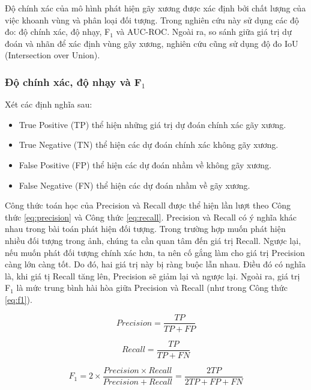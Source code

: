 \documentclass[../the.tex]{subfiles}
\begin{document}
{\fontsize{13}{12} \selectfont
Độ chính xác của mô hình phát hiện gãy xương được xác định bởi chất lượng của việc khoanh vùng và phân loại đối tượng. Trong nghiên cứu này sử dụng các độ đo: độ chính xác, độ nhạy, F$_1$ và AUC-ROC. Ngoài ra, so sánh giữa giá trị dự đoán và nhãn để xác định vùng gãy xương, nghiên cứu cũng sử dụng độ đo IoU (Intersection over Union). 
}

\subsubsection*{Độ chính xác, độ nhạy và F$_1$}

{\fontsize{13}{12} \selectfont
Xét các định nghĩa sau:
\begin {itemize}
  \item True Positive (TP) thể hiện những giá trị dự đoán chính xác gãy xương.
  \item True Negative (TN) thể hiện các dự đoán chính xác không gãy xương.
  \item False Positive (FP) thể hiện các dự đoán nhầm về không gãy xương.
  \item False Negative (FN) thể hiện các dự đoán nhầm về gãy xương.
\end {itemize}

Công thức toán học của Precision và Recall được thể hiện lần lượt theo Công thức \ref{eq:precision} và Công thức \ref{eq:recall}. Precision và Recall có ý nghĩa khác nhau trong bài toán phát hiện đối tượng. Trong trường hợp muốn phát hiện nhiều đối tượng trong ảnh, chúng ta cần quan tâm đến giá trị Recall. Ngược lại, nếu muốn phát đối tượng chính xác hơn, ta nên cố gắng làm cho giá trị Precision càng lớn càng tốt. Do đó, hai giá trị này bị ràng buộc lẫn nhau. Điều đó có nghĩa là, khi giá tị Recall tăng lên, Precision sẽ giảm lại và ngược lại. Ngoài ra, giá trị F$_1$ là mức trung bình hài hòa giữa Precision và Recall (như trong Công thức \ref{eq:f1}).
}

\begin{equation}
    Precision = \frac{TP}{TP + FP}
    \label{eq:precision}
\end{equation}

\begin{equation}
    Recall = \frac{TP}{TP + FN}
    \label{eq:recall}
\end{equation}

\begin{equation}
    F_1 = 2 \times \frac{Precision \times Recall}{Precision + Recall} = \frac{2TP}{2TP + FP + FN}
    \label{eq:f1}
\end{equation}
\end{document}
